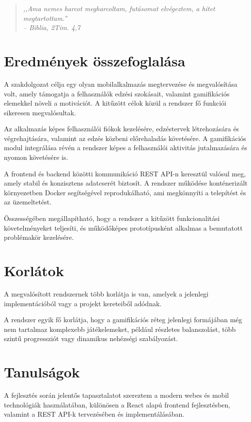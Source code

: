 \documentclass[
]{thesis-ekf}
\theoremstyle{definition}
\theoremstyle{remark}
\begin{document}
\begin{quote}
    \centering
    \emph{,,Ama nemes harcot megharcoltam, futásomat elvégeztem, a hitet megtartottam.''\\
-- Biblia, 2Tim. 4,7\cite{biblia}}
\end{quote}


\section{Eredmények összefoglalása}

A szakdolgozat célja egy olyan mobilalkalmazás megtervezése és megvalósítása volt, amely támogatja a felhasználók edzési szokásait, valamint gamifikációs elemekkel növeli a motivációt. A kitűzött célok közül a rendszer fő funkciói sikeresen megvalósultak.

Az alkalmazás képes felhasználói fiókok kezelésére, edzéstervek létrehozására és végrehajtására, valamint az edzés közbeni előrehaladás követésére. A gamifikációs modul integrálása révén a rendszer képes a felhasználói aktivitás jutalmazására és nyomon követésére is.

A frontend és backend közötti kommunikáció REST API-n keresztül valósul meg, amely stabil és konzisztens adatcserét biztosít. A rendszer működése konténerizált környezetben Docker segítségével reprodukálható, ami megkönnyíti a telepítést és az üzemeltetést.

Összességében megállapítható, hogy a rendszer a kitűzött funkcionalitási követelményeket teljesíti, és működőképes prototípusként alkalmas a bemutatott problémakör kezelésére.

\section{Korlátok}

A megvalósított rendszernek több korlátja is van, amelyek a jelenlegi implementációból vagy a projekt kereteiből adódnak.

A rendszer egyik fő korlátja, hogy a gamifikációs réteg jelenlegi formájában még nem tartalmaz komplexebb játékelemeket, például részletes balanszolást, több szintű progressziót vagy dinamikus nehézségi szabályozást.

\section{Tanulságok}

A fejlesztés során jelentős tapasztalatot szereztem a modern webes és mobil technológiák használatában, különösen a React alapú frontend fejlesztésben, valamint a REST API-k tervezésében és implementálásában.
\end{document}

